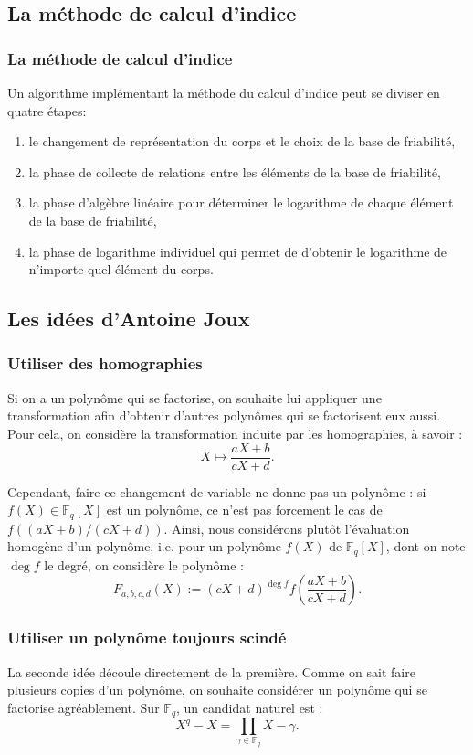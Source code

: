 \documentclass{beamer}
\theoremstyle{definition}
\theoremstyle{remark}
\def\gf #1{\mathbb{F}_{#1}}
\begin{document}
\subsection{La méthode de calcul d'indice}
\begin{frame}
  \frametitle{La méthode de calcul d'indice}
   Un algorithme implémentant la méthode du calcul d'indice peut se diviser en quatre étapes:
   \begin{enumerate}
\item le changement de représentation du corps et le choix de la base de friabilité,
\item la phase de collecte de relations entre les éléments de la base de friabilité,
\item la phase d'algèbre linéaire pour déterminer le logarithme de chaque élément de la base de friabilité,
\item la phase de logarithme individuel qui permet de d'obtenir le logarithme de n’importe quel élément du corps.
\end{enumerate}
\end{frame}

\subsection{Les idées d'Antoine Joux}
\begin{frame}
  \frametitle{Utiliser des homographies}
  Si on a un polynôme qui se factorise, on souhaite lui appliquer une transformation afin d'obtenir d'autres polynômes qui se factorisent eux aussi. Pour cela, on considère la transformation induite par les homographies, à savoir :
$$X \mapsto \frac{aX+b}{cX+d}.$$

  Cependant, faire ce changement de variable ne donne pas un polynôme : si $f(X) \in\gf{q}[X]$ est un polynôme, ce n'est pas forcement le cas de $f((aX+b)/(cX+d))$. Ainsi, nous considérons plutôt l'évaluation homogène d'un polynôme, i.e. pour un polynôme $f(X)$ de $\gf{q}[X]$, dont on note $\deg f$ le degré, on considère le polynôme :
  $$F_{a,b,c,d}(X) := (cX+d)^{\deg f} f \left(\frac{aX+b}{cX+d}\right).$$
\end{frame}

\begin{frame}
  \frametitle{Utiliser un polynôme toujours scindé}
  La seconde idée découle directement de la première. Comme on sait faire plusieurs \og{}copies\fg{} d'un polynôme, on souhaite considérer un polynôme qui se factorise agréablement. Sur $\gf{q}$, un candidat naturel est : $$X^q -X = \prod_{\gamma\in\gf{q}} X-\gamma.$$
\end{frame}
\end{document}
